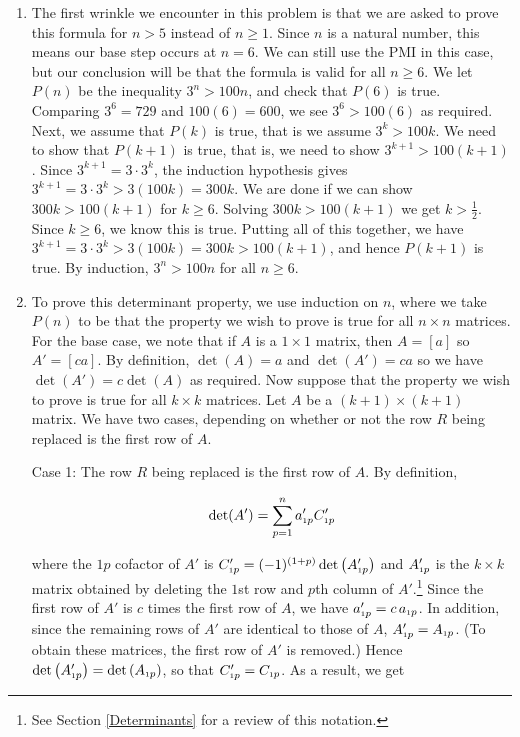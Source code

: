 \begin{ex}
\begin{enumerate}
\item The first wrinkle we encounter in this problem is that we are asked to prove this formula for $n > 5$ instead of $n \geq 1$.  Since $n$ is a natural number, this means our base step occurs at $n=6$.  We can still use the PMI in this case, but our conclusion will be that the formula is valid for all $n \geq 6$.  We let $P(n)$ be the inequality  $3^{n} > 100n$, and check that $P(6)$ is true. Comparing $3^6 =  729$ and $100(6) = 600$, we see $3^6 > 100(6)$ as required.  Next, we assume that $P(k)$ is true, that is we assume $3^{k} > 100k$.  We need to show that $P(k+1)$ is true, that is, we need to show $3^{k+1} > 100(k+1)$.  Since $3^{k+1} = 3 \cdot 3^{k}$, the induction hypothesis gives $3^{k+1} = 3 \cdot 3^{k} > 3(100k) = 300k$. We are done if we can show $300k > 100(k+1)$ for $k \geq 6$.  Solving $300k > 100(k+1)$ we get $k > \frac{1}{2}$.  Since $k \geq 6$, we know this is true.  Putting all of this together, we have $3^{k+1} = 3 \cdot 3^{k} > 3(100k) = 300k > 100(k+1)$, and hence $P(k+1)$ is true.  By induction, $3^{n} > 100n$ for all $n \geq 6$. 

\item  To prove this determinant property, we use induction on $n$, where we take $P(n)$ to be that the property we wish to prove is true for all $n \times n$ matrices. For the base case, we note that if $A$ is a $1 \times 1$ matrix, then $A = [a]$ so $A' = [ca]$.  By definition, $\det(A) = a$ and $\det(A') = ca$ so we have $\det(A') = c \det(A)$ as required. Now suppose that the property we wish to prove is true for all $k \times k$ matrices.  Let $A$ be a $(k+1) \times (k+1)$ matrix.  We have two cases, depending on whether or not the row $R$ being replaced is the first row of $A$.  

{ \sc Case 1: } The row $R$ being replaced is the first row of $A$. By definition,

\[ \det(A') = \displaystyle{\sum_{p=1}^{n} a'_{\mbox{\tiny$1$}p} C'_{\mbox{\tiny$1$}p}}\]

where the $1p$ cofactor of $A'$ is $C'_{\mbox{\tiny$1$}p} = (-1)^{(1+p)} \det\left(A'_{\mbox{\tiny$1$}p}\right)$ and $A'_{\mbox{\tiny$1$}p}$ is the $k \times k$ matrix obtained by deleting the $1$st row and $p$th column of $A'$.\footnote{See Section \ref{Determinants} for a review of this notation.} Since the first row of $A'$ is $c$ times the first row of $A$,  we have $a'_{\mbox{\tiny$1$}p} = c \, a_{\mbox{\tiny$1$}p}$.  In addition, since the remaining rows of $A'$ are identical to those of $A$, $A'_{\mbox{\tiny$1$}p} = A_{\mbox{\tiny$1$}p}$.  (To obtain these matrices, the first row of $A'$ is removed.)  Hence $\det\left(A'_{\mbox{\tiny$1$}p}\right) = \det\left(A_{\mbox{\tiny$1$}p}\right)$, so that $C'_{\mbox{\tiny$1$}p} = C_{\mbox{\tiny$1$}p}$.  As a result, we get


\end{enumerate}
\end{ex}

